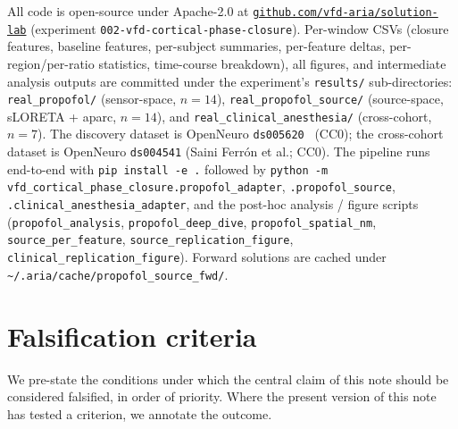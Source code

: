\documentclass[11pt,a4paper]{article}
\begin{document}
All code is open-source under Apache-2.0 at \href{https://github.com/vfd-aria/solution-lab}{\texttt{github.com/vfd-aria/solution-lab}} (experiment \texttt{002-vfd-cortical-phase-closure}). Per-window CSVs (closure features, baseline features, per-subject summaries, per-feature deltas, per-region/per-ratio statistics, time-course breakdown), all figures, and intermediate analysis outputs are committed under the experiment's \texttt{results/} sub-directories: \texttt{real\_propofol/} (sensor-space, $n=14$), \texttt{real\_propofol\_source/} (source-space, sLORETA + aparc, $n=14$), and \texttt{real\_clinical\_anesthesia/} (cross-cohort, $n=7$). The discovery dataset is OpenNeuro \texttt{ds005620}~\cite{bajwa2024dataset} (CC0); the cross-cohort dataset is OpenNeuro \texttt{ds004541} (Saini Ferr\'on et al.; CC0). The pipeline runs end-to-end with \texttt{pip install -e .} followed by \texttt{python -m vfd\_cortical\_phase\_closure.propofol\_adapter}, \texttt{.propofol\_source}, \texttt{.clinical\_anesthesia\_adapter}, and the post-hoc analysis / figure scripts (\texttt{propofol\_analysis}, \texttt{propofol\_deep\_dive}, \texttt{propofol\_spatial\_nm}, \texttt{source\_per\_feature}, \texttt{source\_replication\_figure}, \texttt{clinical\_replication\_figure}). Forward solutions are cached under \texttt{\textasciitilde/.aria/cache/propofol\_source\_fwd/}.

\section{Falsification criteria}\label{sec:falsification}

We pre-state the conditions under which the central claim of this note should be considered falsified, in order of priority. Where the present version of this note has tested a criterion, we annotate the outcome.
\end{document}
